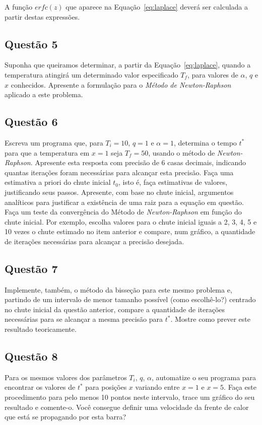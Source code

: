 \documentclass[12pt]{article}
\begin{document}
A função $erfc(z)$ que aparece na Equação~\ref{eq:laplace} deverá ser calculada a partir destas expressões.

\subsection*{Questão 5}
\label{sec:p2q5}
Suponha que queiramos determinar, a partir da Equação~\ref{eq:laplace}, quando a temperatura atingirá um determinado valor especificado $T_{f}$, para valores de $\alpha$, $q$ e $x$ conhecidos. Apresente a formulação para o \textit{Método de Newton-Raphson} aplicado a este problema.

\subsection*{Questão 6}
\label{sec:p2q6}
Escreva um programa que, para $T_{i} = 10$, $q = 1$ e $\alpha = 1$, determina o tempo $t^{*}$ para que a temperatura em $x = 1$ seja $T_{f} = 50$, usando o método de \textit{Newton-Raphson}. Apresente esta resposta com precisão de 6 casas decimais, indicando quantas iterações foram necessárias para alcançar esta precisão. Faça uma estimativa a priori do chute inicial $t_{0}$, isto é, faça estimativas de valores, justificando seus passos. Apresente, com base no chute inicial, argumentos analíticos para justificar a existência de uma raiz para a equação em questão. Faça um teste da convergência do Método de \textit{Newton-Raphson} em função do chute inicial. Por exemplo, escolha valores para o chute inicial iguais a 2, 3, 4, 5 e 10 vezes o chute estimado no item anterior e compare, num gráfico, a quantidade de iterações necessárias para alcançar a precisão desejada.

\subsection*{Questão 7}
\label{sec:p2q7}
Implemente, também, o método da bisseção para este mesmo problema e, partindo de um intervalo de menor tamanho possível (como escolhê-lo?) centrado no chute inicial da questão anterior, compare a quantidade de iterações necessárias para se alcançar a mesma precisão para $t^{*}$. Mostre como prever este resultado teoricamente.

\subsection*{Questão 8}
\label{sec:p2q8}
Para os mesmos valores dos parâmetros $T_{i}$, $q$, $\alpha$, automatize o seu programa para encontrar os valores de $t^{*}$ para posições $x$ variando entre $x = 1$ e $x = 5$. Faça este procedimento para pelo menos 10 pontos neste intervalo, trace um gráfico do seu resultado e comente-o. Você consegue definir uma velocidade da frente de calor que está se propagando por esta barra?
\end{document}
